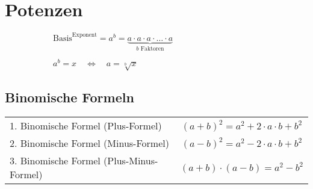 \documentclass[11pt,a4paper,oneside]{article}
\newcommand{\sidebysideB}[2]{
\begin{figure}[H]
\begin{subfigure}[t]{0.5\linewidth}
#1
\end{subfigure}%
\begin{subfigure}[t]{0.5\linewidth}
#2
\end{subfigure}
\end{figure}
}
\begin{document}
\section{Potenzen}
\sidebysideB{
$\text{Basis}^{\text{Exponent}}=a^{b}=\underbrace{a\cdot a\cdot a\cdot\ldots\cdot a}_{b\text{ Faktoren}}$}{$a^{b}=x\quad\Leftrightarrow\quad a=\sqrt[b]{x}$}

\subsection{Binomische Formeln}
\vspace{-1em}
\begin{table}[H]
\begin{tabular}{@{}lc}
\rule{0pt}{1.5em}1. Binomische Formel (Plus-Formel) & $\left(a+b\right)^{2}=a^{2}+2\cdot a\cdot b+b^{2}$\\
\rule{0pt}{1.5em}2. Binomische Formel (Minus-Formel) & $\left(a-b\right)^{2}=a^{2}-2\cdot a\cdot b+b^{2}$\\
\rule{0pt}{1.5em}3. Binomische Formel (Plus-Minus-Formel) & $\left(a+b\right)\cdot\left(a-b\right)=a^{2}-b^{2}$\\
\end{tabular}
\end{table}









\vspace{-1em}
\end{document}
